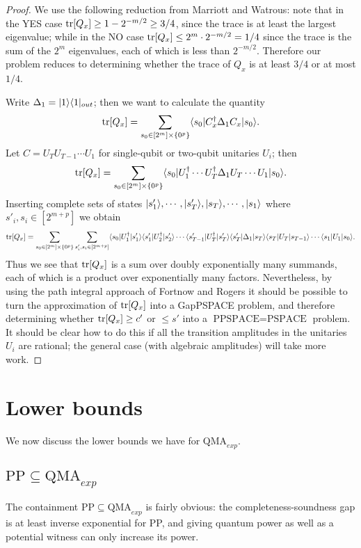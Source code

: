 \documentclass[english]{article}
\numberwithin{equation}{section}
\numberwithin{figure}{section}
\theoremstyle{plain}
\theoremstyle{definition}
\theoremstyle{plain}
\theoremstyle{definition}
\theoremstyle{remark}
\theoremstyle{remark}
\theoremstyle{plain}
\begin{document}
\begin{proof}
We use the following reduction from Marriott and Watrous: note that in the YES case $\operatorname{tr}[Q_x]\ge 1 - 2^{-m/2} \ge 3/4$, since the trace is at least the largest eigenvalue; while in the NO case $\operatorname{tr}[Q_x]\le 2^m \cdot 2^{-m/2} =1/4$ since the trace is the sum of the $2^m$ eigenvalues, each of which is less than $2^{-m/2}$. Therefore our problem reduces to determining whether the trace of $Q_x$ is at least $3/4$ or at most $1/4$.

Write $\Delta_1 = |1\rangle\langle 1|_{out}$; then we want to calculate the quantity
\begin{equation}
\operatorname{tr}[Q_x] = \sum_{s_0 \in [2^m] \times \{0^p\}} \langle s_0| C^\dagger_x \Delta_1 C_x |s_0\rangle.
\end{equation}
Let $C = U_TU_{T-1}\cdots U_1$ for single-qubit or two-qubit unitaries $U_i$; then
\begin{equation}
\operatorname{tr}[Q_x] = \sum_{s_0 \in [2^m] \times \{0^p\}} \langle s_0| U_1^\dagger \cdots U_T^\dagger \Delta_1 U_T\cdots U_1 |s_0\rangle.
\end{equation}
Inserting complete sets of states $|s'_1\rangle,\cdots,|s'_T\rangle,|s_T\rangle,\cdots,|s_1\rangle$ where $s'_i,s_i \in [2^{m+p}]$ we obtain
\begin{equation}
\operatorname{tr}[Q_x] = \sum_{s_0 \in [2^m] \times \{0^p\}} \sum_{s'_i,s_i \in [2^{m+p}]} \langle s_0| U_1^\dagger |s'_1\rangle\langle s'_1|U_2^\dagger|s'_2\rangle \cdots \langle s'_{T-1}|U_T^\dagger|s'_T\rangle \langle s'_T|\Delta_1 |s_T\rangle\langle s_T|U_T|s_{T-1}\rangle\cdots \langle s_1|U_1 |s_0\rangle.
\end{equation}
Thus we see that $\operatorname{tr}[Q_x]$ is a sum over doubly exponentially many summands, each of which is a product over exponentially many factors. Nevertheless, by using the path integral approach of Fortnow and Rogers it should be possible to turn the approximation of $\operatorname{tr}[Q_x]$ into a GapPSPACE problem, and therefore determining whether $\operatorname{tr}[Q_x] \ge c'$ or $\le s'$ into a $\text{PPSPACE} = \text{PSPACE}$ problem. It should be clear how to do this if all the transition amplitudes in the unitaries $U_i$ are rational; the general case (with algebraic amplitudes) will take more work.

\end{proof}

\section{Lower bounds}
We now discuss the lower bounds we have for $\text{QMA}_{exp}$.
\subsection{$\text{PP}\subseteq \text{QMA}_{exp}$}
The containment $\text{PP}\subseteq \text{QMA}_{exp}$ is fairly obvious: the completeness-soundness gap is at least inverse exponential for PP, and giving quantum power as well as a potential witness can only increase its power.
\end{document}
